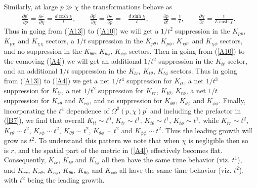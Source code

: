 \documentclass[aps]{revtex4}
\begin{document}
Similarly,  at large $p\gg \chi$ the transformations behave as 
%
\begin{eqnarray}
\frac{\partial p^{\prime }}{\partial p}=\frac{\partial r^{\prime }}{\partial \chi}=\frac{d\cosh\chi}{t},\qquad
\frac{\partial p^{\prime }}{\partial \chi}=\frac{\partial r^{\prime }}{\partial p}=-\frac{d\sinh\chi}{t},\qquad \frac{\partial p}{\partial t}=\frac{1}{t},\qquad \frac{\partial \chi}{\partial r}=\frac{1}{L\cosh\chi}.
\label{B11}
\end{eqnarray}
%
Thus in going from (\ref{A13}) to (\ref{A10}) we will get a $1/t^2$ suppression in the $K_{pp}$, $K_{p\chi}$ and $K_{\chi\chi}$ sectors, a $1/t$ suppression in the $K_{p\theta}$, $K_{p\phi}$, $K_{\chi\theta}$, and $K_{\chi\phi}$ sectors, and no suppression in the $K_{\theta\theta}$, $K_{\theta  \phi}$, $K_{\phi\phi}$ sectors. Then in going from (\ref{A10}) to the comoving (\ref{A4}) we will get an additional $1/t^2$ suppression in the $K_{tt}$ sector,  and an additional  $1/t$ suppression in the $K_{tr}$, $K_{t\theta}$, $K_{t\phi}$ sectors. Thus in going from (\ref{A13}) to (\ref{A4}) we get a net $1/t^4$ suppression for  $K_{tt}$,  a net $1/t^3$ suppression for  $K_{tr}$, a net $1/t^2$ suppression for  $K_{rr}$, $K_{t\theta}$, $K_{t\phi}$, a net $1/t$ suppression for  $K_{r\theta}$ and $K_{r\phi}$, and no suppression for $K_{\theta\theta}$, $K_{\theta\phi}$ and $K_{\phi\phi}$. Finally, incorporating the $t^4$ dependence of $\Omega^2(p,\chi)p^{\prime}$ and including the prefactor in (\ref{B7}), we find that overall $K_{tt}\sim t^0$, $K_{tr}\sim t^1$, $K_{t\theta}\sim t^1$, $K_{t\phi}\sim t^1$, while $K_{rr}\sim t^2$, $K_{r\theta}\sim t^2$, $K_{r\phi}\sim t^2$,  $K_{\theta\theta}\sim t^2$, $K_{\theta\phi}\sim t^2$ and $K_{\phi\phi}\sim t^2$. Thus the leading growth will grow as $t^2$. To understand this pattern we note that when $\chi$ is negligible then so is $r$, and the spatial part of the metric in (\ref{A4}) effectively becomes flat. Consequently,  $K_{tr}$, $K_{t\theta}$ and $K_{t\phi}$ all then have the same time behavior (viz. $t^1$), and $K_{rr}$, $K_{r\theta}$, $K_{r\phi}$,  $K_{\theta\theta}$, $K_{\theta\phi}$ and $K_{\phi\phi}$  all have the same time behavior (viz. $t^2$), with $t^2$ being the leading growth.
\end{document}
